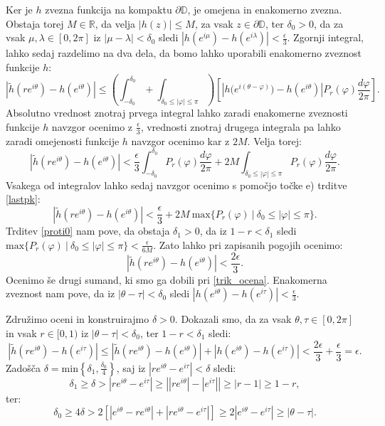\documentclass[mat1]{fmfdelo}
\begin{document}
\begin{dokaz}
        Ker je $h$ zvezna funkcija na kompaktu $\partial \mathbb{D}$, je omejena in enakomerno zvezna.  
        Obstaja torej $M \in \mathbb{R}$, da velja $|h(z)| \leq M$, za vsak $z \in \partial \mathbb{D}$, ter $\delta_0 >0$, da za vsak $\mu, \lambda \in [0,2\pi]$ iz $|\mu - \lambda| < \delta_0$ sledi $|h(e^{i \mu}) - h(e^{i \lambda})| < \frac{\epsilon}{3}$.
        Zgornji integral, lahko sedaj razdelimo na dva dela, da bomo lahko uporabili enakomerno zveznost funkcije $h$:
        $$
        \left|\widetilde{h}(re^{i\theta}) - h(e^{i\theta})\right| \leq \left(\int_{-\delta_0}^{\delta_0} + \int_{\delta_0 \leq |\varphi| \le \pi}\right){\left[\left| h\big(e^{i(\theta - \varphi)}\big) - h(e^{i\theta})\right|P_r(\varphi)\frac{d\varphi}{2\pi}\right]}.
        $$
        Absolutno vrednost znotraj prvega integral lahko zaradi enakomerne zveznosti funkcije $h$ navzgor ocenimo z $\frac{\epsilon}{3}$, vrednosti znotraj drugega integrala pa lahko zaradi omejenosti funkcije $h$ navzgor ocenimo kar z $2M$. Velja torej:
        $$
        \left|\widetilde{h}(re^{i\theta}) - h(e^{i\theta})\right| < \frac{\epsilon}{3} \int_{-\delta_0}^{\delta_0}{P_r(\varphi) \frac{d\varphi}{2\pi}} + 2M\int_{\delta_0 \leq |\varphi| \leq \pi}{P_r(\varphi)\frac{d\varphi}{2\pi}}.
        $$
        Vsakega od integralov lahko sedaj navzgor ocenimo s pomočjo točke e) trditve \ref{lastpk}:
        $$
        \left|\widetilde{h}(re^{i\theta}) - h(e^{i\theta})\right| < \frac{\epsilon}{3}  + 2M~\text{max}\{P_r(\varphi)~| ~\delta_0 \leq |\varphi| \leq \pi \}.
        $$
        Trditev \ref{proti0} nam pove, da obstaja $\delta_1 >0$, da iz $1 - r < \delta_1$ sledi $\text{max}\{P_r(\varphi)~| ~\delta_0 \leq |\varphi| \leq \pi \} < \frac{\epsilon}{6M}$.
        Zato lahko pri zapisanih pogojih ocenimo:
        $$
        \left|\widetilde{h}(re^{i\theta}) - h(e^{i\theta})\right| < \frac{2 \epsilon}{3}.
        $$
        Ocenimo še drugi sumand, ki smo ga dobili pri \eqref{trik_ocena}. Enakomerna zveznost nam pove, da iz $|\theta - \tau| < \delta_0$ sledi $|h\left(e^{i\theta}\right) - h\left(e^{i\tau}\right)| < \frac{\epsilon}{3}$.
        
        Združimo oceni in konstruirajmo $\delta>0$. Dokazali smo, da za vsak $\theta, \tau \in [0,2\pi]$ in vsak $r \in [0,1)$ iz $|\theta - \tau| < \delta_0$, ter $1- r < \delta_1$ sledi:
        $$
        \left|\widetilde{h}(r e^{i \theta}) - h(e^{i\tau})\right| \leq \left|\widetilde{h}(re^{i\theta}) - h(e^{i\theta})\right| + \left|h\left(e^{i\theta}\right) - h\left(e^{i\tau}\right)\right| < \frac{2 \epsilon}{3} + \frac{\epsilon}{3} = \epsilon.
        $$
        Zadošča $\delta = \text{min}\left\{\delta_1, \frac{\delta_0}{4}\right\}$, saj iz $|r e^{i \theta} - e^{i\tau}| < \delta$ sledi: 
        $$ 
            \delta_1 \geq \delta > |r e^{i \theta} - e^{i\tau}| \geq \left||r e^{i \theta}| - |e^{i\tau}|\right| \geq |r - 1| \geq 1 -r, 
        $$
        ter:
        $$ 
            \delta_0 \geq 4 \delta > 2 \left[\left| e^{i \theta} - r e^{i\theta} \right| +  \left|r e^{i\theta} - e^{i\tau} \right| \right] \geq 2 \left|e^{i\theta} - e^{i\tau} \right| \geq |\theta - \tau|.
        $$
    \end{dokaz}
\end{document}
